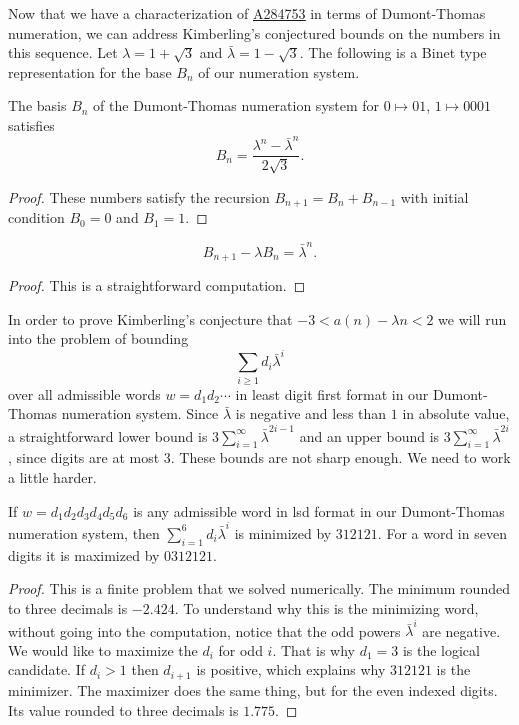\documentclass[12pt,reqno]{article}
\newcommand{\seqnum}[1]{\href{https://oeis.org/#1}{\rm \underline{#1}}}
\begin{document}
Now that we have a characterization of \seqnum{A284753} in terms of Dumont-Thomas
numeration, we can address Kimberling's conjectured bounds on the numbers in this
sequence.
Let $\lambda=1+\sqrt 3$ and $\bar\lambda=1-\sqrt 3$. The following is a Binet
type representation for the base $B_n$ of our numeration system.

\begin{lemma}
The basis $B_n$ of the Dumont-Thomas numeration system for $0\mapsto 01$,
$1\mapsto 0001$ satisfies
    \[B_n=\frac{\lambda^n-\bar\lambda^n}{2\sqrt 3}.\]
\end{lemma}
\begin{proof}
    These numbers satisfy the recursion $B_{n+1}=B_n+B_{n-1}$ with initial
    condition $B_0=0$ and $B_1=1$.
\end{proof}

\begin{lemma}
    \[B_{n+1}-\lambda B_n=\bar\lambda^{n}.\]
\end{lemma}
\begin{proof}
    This is a straightforward computation.
\end{proof}

In order to prove Kimberling's conjecture that $-3<a(n)-\lambda n<2$ we will run
into the problem of bounding
\[
\sum_{i\geq 1} d_i\bar\lambda^i
\]
over all admissible words $w=d_1d_2\cdots$ in least digit first format in our
Dumont-Thomas numeration system. Since $\bar\lambda$ is negative and less than
$1$ in absolute value, a straightforward lower bound is 
$3\sum_{i=1}^\infty \bar\lambda^{2i-1}$ and an upper bound is
$3\sum_{i=1}^\infty \bar\lambda^{2i}$, since digits are at most $3$.
These bounds are not sharp enough. We need to work a little harder. 

\begin{lemma}
    If $w=d_1d_2d_3d_4d_5d_6$ is any admissible word in lsd format in
    our Dumont-Thomas numeration system, then $\sum_{i=1}^6 d_i\bar\lambda^i$
    is minimized by $312121$. For a word in seven digits it is maximized by $0312121$.
\end{lemma}
\begin{proof}
    This is a finite problem that we solved numerically. 
    The minimum rounded to three decimals is $-2.424$. To understand why
    this is the minimizing word, without going into the computation, 
    notice that the odd powers $\bar\lambda^i$ are
    negative. We would like to maximize the $d_i$ for odd $i$. That is
    why $d_1=3$ is the logical candidate. If $d_i>1$ then $d_{i+1}$ is
    positive, which explains why $312121$ is the minimizer. The maximizer
    does the same thing, but for the even indexed digits. Its value
    rounded to three decimals is $1.775$.
\end{proof}
\end{document}
